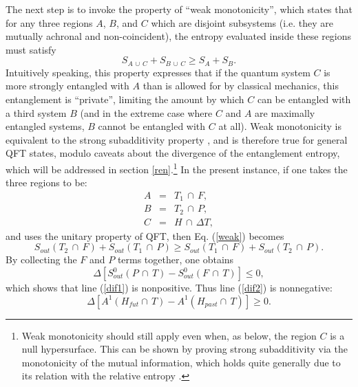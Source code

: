 \documentclass[11pt]{article}
\begin{document}
The next step is to invoke the property of ``weak monotonicity'', which states that for any three regions $A$, $B$, and $C$ which are disjoint subsystems (i.e. they are mutually achronal and non-coincident), the entropy evaluated inside these regions must satisfy
\begin{equation}\label{weak}
S_{A\,\cup\,C} + S_{B\,\cup\,C} \ge S_{A} + S_{B}.
\end{equation}
Intuitively speaking, this property expresses that if the quantum system $C$ is more strongly entangled with $A$ than is allowed for by classical mechanics, this entanglement is ``private'', limiting the amount by which $C$ can be entangled with a third system $B$ (and in the extreme case where $C$ and $A$ are maximally entangled systems, $B$ cannot be entangled with $C$ at all).  Weak monotonicity is equivalent to the strong subadditivity property \cite{pipp03}, and is therefore true for general QFT states, modulo caveats about the divergence of the entanglement entropy, which will be addressed in section \ref{ren}.\footnote{Weak monotonicity should still apply even when, as below, the region $C$ is a null hypersurface.  This can be shown by proving strong subadditivity via the monotonicity of the mutual information, which holds quite generally due to its relation with the relative entropy \cite{CH04}.} In the present instance, if one takes the three regions to be:
\begin{eqnarray}
A &=& T_1\,\cap\,F, \\
B &=& T_2\,\cap\,P, \\
C &=& H\,\cap\,\Delta T,
\end{eqnarray} 
and uses the unitary property of QFT, then Eq. (\ref{weak}) becomes
\begin{equation}\label{weakapp}
S_{out}(T_2\,\cap\,F) + S_{out}(T_1\,\cap \,P) 
\ge S_{out}(T_1\,\cap\,F) + S_{out}(T_2\,\cap \,P).
\end{equation}
By collecting the $F$ and $P$ terms together, one obtains
\begin{equation}\label{nonpos}
\Delta \left[ S_{out}^{0}(P\,\cap\,T) 
- S_{out}^{0}(F\,\cap\,T) \right] \le 0,
\end{equation}
which shows that line (\ref{dif1}) is nonpositive.  Thus line (\ref{dif2}) is nonnegative:
\begin{equation}\label{deltaA}
\Delta \left[ A^{1}(H_{fut}\cap\,T) - A^{1}(H_{past}\cap\,T) \right] \ge 0.
\end{equation}
\end{document}
